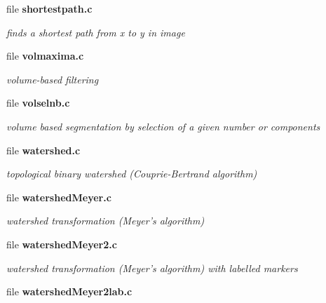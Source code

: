 \begin{DoxyCompactItemize}
\item 
file {\bf shortestpath.c}


\begin{DoxyCompactList}\small\item\em finds a shortest path from x to y in image \item\end{DoxyCompactList}

\item 
file {\bf volmaxima.c}


\begin{DoxyCompactList}\small\item\em volume-\/based filtering \item\end{DoxyCompactList}

\item 
file {\bf volselnb.c}


\begin{DoxyCompactList}\small\item\em volume based segmentation by selection of a given number or components \item\end{DoxyCompactList}

\item 
file {\bf watershed.c}


\begin{DoxyCompactList}\small\item\em topological binary watershed (Couprie-\/Bertrand algorithm) \item\end{DoxyCompactList}

\item 
file {\bf watershedMeyer.c}


\begin{DoxyCompactList}\small\item\em watershed transformation (Meyer's algorithm) \item\end{DoxyCompactList}

\item 
file {\bf watershedMeyer2.c}


\begin{DoxyCompactList}\small\item\em watershed transformation (Meyer's algorithm) with labelled markers \item\end{DoxyCompactList}

\item 
file {\bf watershedMeyer2lab.c}



\end{DoxyCompactItemize}
